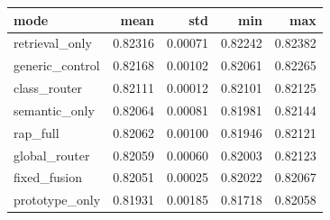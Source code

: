 \begin{tabular}{lrrrr}
\toprule
mode & mean & std & min & max \\
\midrule
retrieval_only & 0.82316 & 0.00071 & 0.82242 & 0.82382 \\
generic_control & 0.82168 & 0.00102 & 0.82061 & 0.82265 \\
class_router & 0.82111 & 0.00012 & 0.82101 & 0.82125 \\
semantic_only & 0.82064 & 0.00081 & 0.81981 & 0.82144 \\
rap_full & 0.82062 & 0.00100 & 0.81946 & 0.82121 \\
global_router & 0.82059 & 0.00060 & 0.82003 & 0.82123 \\
fixed_fusion & 0.82051 & 0.00025 & 0.82022 & 0.82067 \\
prototype_only & 0.81931 & 0.00185 & 0.81718 & 0.82058 \\
\bottomrule
\end{tabular}
